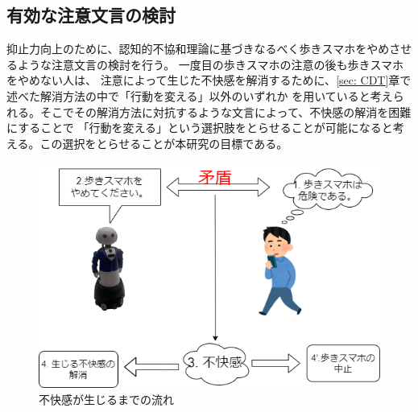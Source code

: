 \documentclass{kuisthesis}
\begin{document}


\subsection{有効な注意文言の検討}
抑止力向上のために、認知的不協和理論に基づきなるべく歩きスマホをやめさせるような注意文言の検討を行う。
一度目の歩きスマホの注意の後も歩きスマホをやめない人は、
注意によって生じた不快感を解消するために、\ref{sec: CDT}章で述べた解消方法の中で「行動を変える」以外のいずれか
を用いていると考えられる。そこでその解消方法に対抗するような文言によって、不快感の解消を困難にすることで
「行動を変える」という選択肢をとらせることが可能になると考える。この選択をとらせることが本研究の目標である。
\label{sec: dissonance}
\begin{figure}[htbp]
  
  \includegraphics[width=13cm]{img/CDT.png}
  \caption{不快感が生じるまでの流れ}
  \label{fig: dissonance}
\end{figure}
\end{document}

